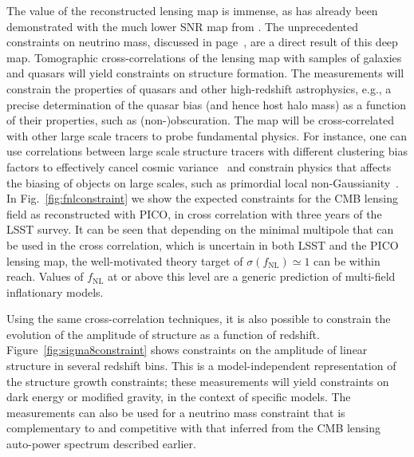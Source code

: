 \documentclass[PICOReport.tex]{subfiles}
\begin{document}
The value of the reconstructed lensing map is immense, as has already been demonstrated with the much lower \ac{SNR} map from \planck . The unprecedented constraints on neutrino mass, discussed in page~\pageref{neutrino_fundamental}, are a direct result of this deep map. Tomographic cross-correlations of the lensing map with samples of galaxies and quasars will yield constraints on structure formation. The measurements will constrain the properties of quasars and other high-redshift astrophysics, e.g., a precise determination of the quasar bias (and hence host halo mass) as a function of their properties, such as (non-)obscuration. The map will be cross-correlated with other large scale tracers to probe fundamental physics.  For instance, one can use correlations between large scale structure tracers with different clustering bias factors to effectively cancel cosmic variance~\citep{2009PhRvL.102b1302S,2018PhRvD..97l3540S} and constrain physics that affects the biasing of objects on large scales, such as primordial local non-Gaussianity~\citep{2008PhRvD..77l3514D}.  In Fig.~\ref{fig:fnlconstraint} we show the expected constraints for the CMB lensing field as reconstructed with PICO, in cross correlation with  three years of the LSST survey. It can be seen that depending on the minimal multipole that can be used in the cross correlation, which is uncertain in both LSST and the PICO lensing map, the well-motivated theory target of $\sigma (f_\mathrm{NL}) \simeq 1$ \citep{2014arXiv1412.4671A} can be within reach. Values of $f_\mathrm{NL}$ at or above this level are a generic prediction of multi-field inflationary models.

Using the same cross-correlation techniques, it is also possible to constrain the evolution of the amplitude of structure as a function of redshift.  Figure~\ref{fig:sigma8constraint} shows constraints on the amplitude of linear structure in several redshift bins.  This is a model-independent representation of the structure growth constraints; these measurements will yield constraints on dark energy or modified gravity, in the context of specific models.  The measurements can also be used for a neutrino mass constraint that is complementary to and competitive with that inferred from the CMB lensing auto-power spectrum described earlier.  
\end{document}
